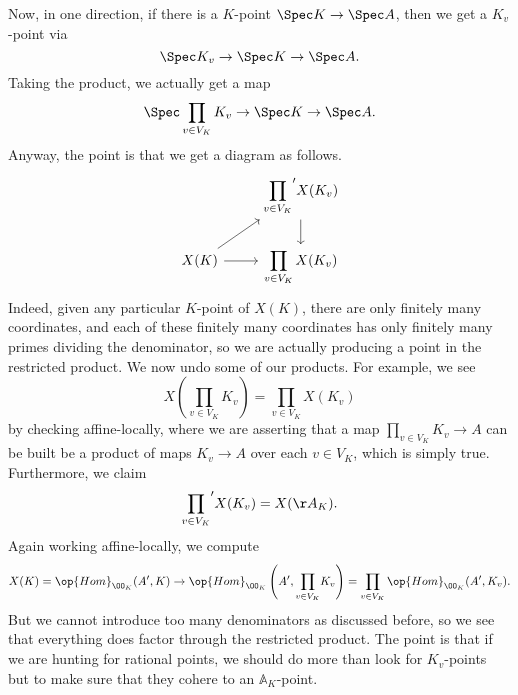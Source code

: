 \documentclass[../notes.tex]{subfiles}
\begin{document}
Now, in one direction, if there is a $K$-point $\Spec K\to\Spec A$, then we get a $K_v$-point via
\[\Spec K_v\to\Spec K\to\Spec A.\]
Taking the product, we actually get a map
\[\Spec\prod_{v\in V_K}K_v\to\Spec K\to\Spec A.\]
Anyway, the point is that we get a diagram as follows.
\[\begin{tikzcd}
	& {{\displaystyle\prod_{v\in V_K}}'X(K_v)} \\
	{X(K)} & {\displaystyle\prod_{v\in V_K}X(K_v)}
	\arrow[from=2-1, to=1-2]
	\arrow[from=1-2, to=2-2]
	\arrow[from=2-1, to=2-2]
\end{tikzcd}\]
Indeed, given any particular $K$-point of $X(K)$, there are only finitely many coordinates, and each of these finitely many coordinates has only finitely many primes dividing the denominator, so we are actually producing a point in the restricted product. We now undo some of our products. For example, we see
\[X\left(\prod_{v\in V_K}K_v\right)=\prod_{v\in V_K}X(K_v)\]
by checking affine-locally, where we are asserting that a map $\prod_{v\in V_K}K_v\to A$ can be built be a product of maps $K_v\to A$ over each $v\in V_K$, which is simply true. Furthermore, we claim
\[{\displaystyle\prod_{v\in V_K}}'X(K_v)=X(\AA_K).\]
Again working affine-locally, we compute
\[X(K)=\op{Hom}_{\OO_K}(A',K)\to\op{Hom}_{\OO_K}\left(A',{\prod_{v\in V_K}}K_v\right)=\prod_{v\in V_K}\op{Hom}_{\OO_K}(A',K_v).\]
But we cannot introduce too many denominators as discussed before, so we see that everything does factor through the restricted product. The point is that if we are hunting for rational points, we should do more than look for $K_v$-points but to make sure that they cohere to an $\mathbb A_K$-point.
\end{document}
